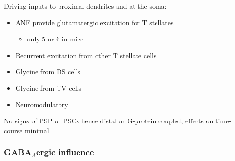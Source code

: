  Driving inputs to proximal dendrites and at the soma:
\begin{itemize}
\item ANF provide glutamatergic excitation for T stellates  \citep{Cant:1981,FerragamoGoldingEtAl:1998a,Alibardi:1998a}
\begin{itemize}
\item only 5 or 6 in mice \citep{FerragamoGoldingEtAl:1998a,CaoOertel:2010}
\end{itemize}
\item Recurrent excitation from other T stellate cells \citep{FerragamoGoldingEtAl:1998a}
\item Glycine from DS cells \citep{FerragamoGoldingEtAl:1998a}
\item Glycine from TV cells \citep{WickesbergOertel:1990,ZhangOertel:1993b}
\item Neuromodulatory
\end{itemize}
     No signs of PSP or PSCs hence distal or G-protein coupled, effects on time-course minimal

\subsubsection{GABA$_A$ergic influence}






